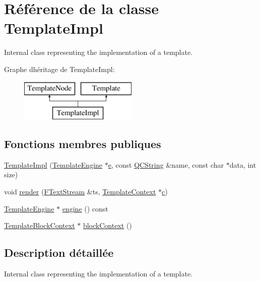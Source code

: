 \hypertarget{class_template_impl}{}\section{Référence de la classe Template\+Impl}
\label{class_template_impl}


Internal class representing the implementation of a template.  


Graphe d\textquotesingle{}héritage de Template\+Impl\+:\begin{figure}[H]
\begin{center}
\leavevmode
\includegraphics[height=2.000000cm]{class_template_impl}
\end{center}
\end{figure}
\subsection*{Fonctions membres publiques}
\begin{DoxyCompactItemize}
\item 
\hyperlink{class_template_impl_a89c69ef0e07596916a767a91b1df26c3}{Template\+Impl} (\hyperlink{class_template_engine}{Template\+Engine} $\ast$\hyperlink{060__command__switch_8tcl_aff65a51a703804e0ad1adbcfd76c86f8}{e}, const \hyperlink{class_q_c_string}{Q\+C\+String} \&name, const char $\ast$data, int size)
\item 
void \hyperlink{class_template_impl_a99ab0382fe9d8d2337647a8c28df70f1}{render} (\hyperlink{class_f_text_stream}{F\+Text\+Stream} \&ts, \hyperlink{class_template_context}{Template\+Context} $\ast$\hyperlink{060__command__switch_8tcl_ab14f56bc3bd7680490ece4ad7815465f}{c})
\item 
\hyperlink{class_template_engine}{Template\+Engine} $\ast$ \hyperlink{class_template_impl_a5823db6f4dbc7fa3e769e6aedf13842f}{engine} () const 
\item 
\hyperlink{class_template_block_context}{Template\+Block\+Context} $\ast$ \hyperlink{class_template_impl_a43eda2b868bc5efc4c55c8ce56d6684b}{block\+Context} ()
\end{DoxyCompactItemize}


\subsection{Description détaillée}
Internal class representing the implementation of a template. 

